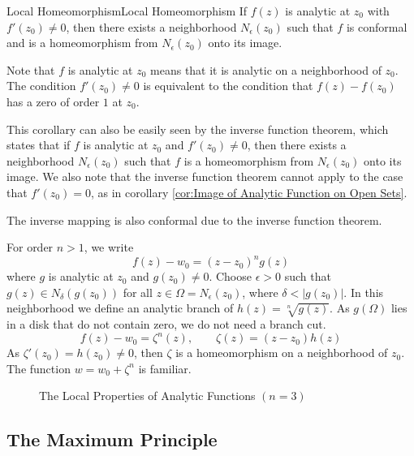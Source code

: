 \documentclass[../main.tex]{subfiles}
\begin{document}
\begin{corollary}{Local Homeomorphism}{Local Homeomorphism}
	If $f(z)$ is analytic at $z_0$ with $f'(z_0)\neq 0$, then there exists a neighborhood $N_\epsilon(z_0)$ such that $f$ is conformal and is a homeomorphism from $N_\epsilon(z_0)$ onto its image.
\end{corollary}
\begin{remark}
Note that $f$ is analytic at $z_0$ means that it is analytic on a neighborhood of $z_0$. The condition $f'(z_0)\neq 0$ is equivalent to the condition that $f(z)-f(z_0)$ has a zero of order $1$ at $z_0$.

This corollary can also be easily seen by the inverse function theorem, which states that if $f$ is analytic at $z_0$ and $f'(z_0)\neq 0$, then there exists a neighborhood $N_\epsilon(z_0)$ such that $f$ is a homeomorphism from $N_\epsilon(z_0)$ onto its image. We also note that the inverse function theorem cannot apply to the case that $f'(z_0) = 0$, as in corollary \ref{cor:Image of Analytic Function on Open Sets}.
\end{remark}


The inverse mapping is also conformal due to the inverse function theorem.

For order $n>1$, we write
\begin{equation*}
	f(z) - w_0 = (z-z_0)^n g(z)
\end{equation*}
where $g$ is analytic at $z_0$ and $g(z_0)\neq 0$. Choose $\epsilon>0$ such that $g(z)\in N_{\delta}(g(z_0))$ for all $z\in \Omega=N_{\epsilon}(z_0)$, where $\delta<\left|g(z_0)\right|$. In this neighborhood we define an analytic branch of $h(z) = \sqrt[n]{g(z)}$. As $g(\Omega)$ lies in a disk that do not contain zero, we do not need a branch cut.
\begin{equation*}
	f(z) - w_0 = \zeta^n(z), \qquad \zeta(z) = (z-z_0)h(z)
\end{equation*}
As $\zeta'(z_0) = h(z_0)\neq 0$, then $\zeta$ is a homeomorphism on a neighborhood of $z_0$. The function $w = w_0+\zeta^n$ is familiar.

\begin{figure}[ht]
    \centering
    \caption{The Local Properties of Analytic Functions $(n=3)$}
    \label{fig:the-local-properties-of-analytic-functions}
\end{figure}

\subsection{The Maximum Principle}
\end{document}
